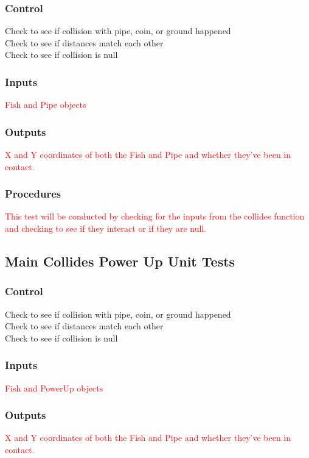 \documentclass[11pt, oneside]{article}   	%
\begin{document}
\subsubsection{Control}
Check to see if collision with pipe, coin, or ground happened \\
Check to see if distances match each other  \\ 
Check to see if collision is null

\subsubsection{Inputs}
\textcolor{red}{Fish and Pipe objects}

\subsubsection{Outputs}
\textcolor{red}{X and Y coordinates of both the Fish and Pipe and whether they've been in contact.}

\subsubsection{Procedures}
\textcolor{red}{This test will be conducted by checking for the inputs from the collides function and checking to see if they interact or if they are null.}

\subsection{Main Collides Power Up Unit Tests}
\subsubsection{Control}
Check to see if collision with pipe, coin, or ground happened \\
Check to see if distances match each other \\
Check to see if collision is null

\subsubsection{Inputs}
\textcolor{red}{Fish and PowerUp objects}

\subsubsection{Outputs}
\textcolor{red}{X and Y coordinates of both the Fish and Pipe and whether they've been in contact.}
\end{document}
